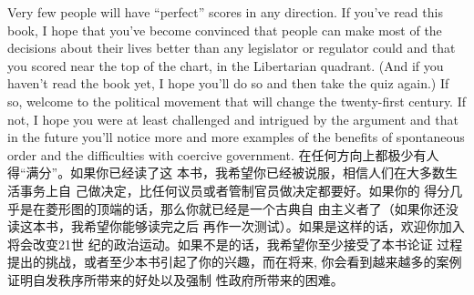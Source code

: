 \begin{paracol}{2}
\switchcolumn*
Very few people will have ``perfect'' scores in any direction. If
you've read this book, I hope that you've become convinced that
people can make most of the decisions about their lives better
than any legislator or regulator could and that you scored near
the top of the chart, in the Libertarian quadrant. (And if you
haven't read the book yet, I hope you'll do so and then take the
quiz again.) If so, welcome to the political movement that will
change the twenty-first century. If not, I hope you were at least
challenged and intrigued by the argument and that in the future
you'll notice more and more examples of the benefits of spontaneous order and the difficulties with coercive government.
\switchcolumn
在任何方向上都极少有人得“满分”。如果你已经读了这
本书，我希望你已经被说服，相信人们在大多数生活事务上自
己做决定，比任何议员或者管制官员做决定都要好。如果你的
得分几乎是在菱形图的顶端的话，那么你就已经是一个古典自
由主义者了（如果你还没读这本书，我希望你能够读完之后
再作一次测试）。如果是这样的话，欢迎你加入将会改变21世
纪的政治运动。如果不是的话，我希望你至少接受了本书论证
过程提出的挑战，或者至少本书引起了你的兴趣，而在将来,
你会看到越来越多的案例证明自发秩序所带来的好处以及强制
性政府所带来的困难。
\end{paracol}